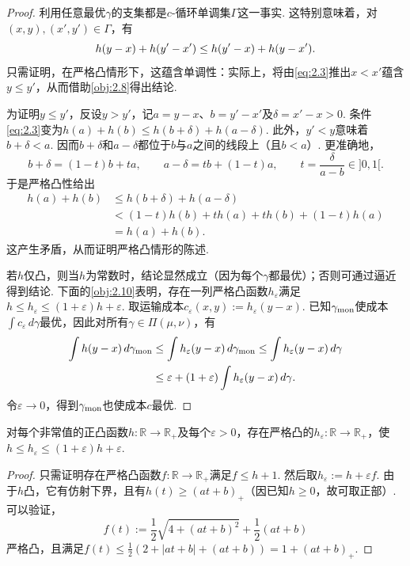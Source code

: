 \begin{proof}
利用任意最优$\gamma$的支集都是$c$-循环单调集$\Gamma$这一事实. 这特别意味着，对$(x,y),(x',y')\in\Gamma$，有
\begin{equation}\label{eq:2.3}\index{0007@$c$-循环单调性（$c$-cyclical monotonicity）|hyperpage}
h(y-x)+h(y'-x')\le h(y'-x)+h(y-x').
\end{equation}
只需证明，在严格凸情形下，这蕴含单调性：实际上，将由\eqref{eq:2.3}推出$x<x'$蕴含$y\le y'$，从而借助\autoref{obj:2.8}得出结论.

为证明$y\le y'$，反设$y>y'$，记$a=y-x$、$b=y'-x'$及$\delta=x'-x>0$. 条件\eqref{eq:2.3}变为$h(a)+h(b)\le h(b+\delta)+h(a-\delta)$. 此外，$y'<y$意味着$b+\delta<a$. 因而$b+\delta$和$a-\delta$都位于$b$与$a$之间的线段上（且$b<a$）. 更准确地，
\[
b+\delta=(1-t)b+ta,\qquad a-\delta=tb+(1-t)a,
\qquad t=\frac{\delta}{a-b}\in]0,1[.
\]
于是严格凸性给出
\[
\begin{aligned}
h(a)+h(b)&\le h(b+\delta)+h(a-\delta)\\
&<(1-t)h(b)+th(a)+th(b)+(1-t)h(a)\\
&=h(a)+h(b).
\end{aligned}
\]
这产生矛盾，从而证明严格凸情形的陈述.

若$h$仅凸，则当$h$为常数时，结论显然成立（因为每个$\gamma$都最优）；否则可通过逼近得到结论. 下面的\autoref{obj:2.10}表明，存在一列严格凸函数$h_\varepsilon$满足$h\le h_\varepsilon\le(1+\varepsilon)h+\varepsilon$. 取运输成本$c_\varepsilon(x,y):=h_\varepsilon(y-x)$. 已知$\gamma_{\rm mon}$使成本$\int c_\varepsilon\,d\gamma$最优，因此对所有$\gamma\in\Pi(\mu,\nu)$，有
\[
\begin{aligned}
\int h(y-x)\,d\gamma_{\rm mon}
&\le\int h_\varepsilon(y-x)\,d\gamma_{\rm mon}
\le\int h_\varepsilon(y-x)\,d\gamma\\
&\le\varepsilon+(1+\varepsilon)\int h_\varepsilon(y-x)\,d\gamma.
\end{aligned}
\]
令$\varepsilon\to0$，得到$\gamma_{\rm mon}$也使成本$c$最优.
\end{proof}

\begin{lemma}\label{obj:2.10}
对每个非常值的正凸函数$h:\mathbb R\to\mathbb R_+$及每个$\varepsilon>0$，存在严格凸的$h_\varepsilon:\mathbb R\to\mathbb R_+$，使$h\le h_\varepsilon\le(1+\varepsilon)h+\varepsilon$.
\end{lemma}
\begin{proof}
只需证明存在严格凸函数$f:\mathbb R\to\mathbb R_+$满足$f\le h+1$. 然后取$h_\varepsilon:=h+\varepsilon f$. 由于$h$凸，它有仿射下界，且有$h(t)\ge(at+b)_+$（因已知$h\ge0$，故可取正部）. 可以验证，
\[
f(t):=\frac12\sqrt{4+(at+b)^2}+\frac12(at+b)
\]
严格凸，且满足$f(t)\le\frac12(2+|at+b|+(at+b))=1+(at+b)_+$.
\end{proof}

